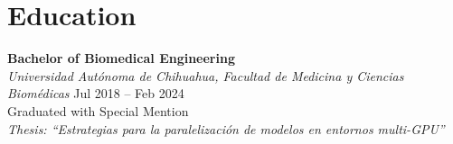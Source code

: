\section*{Education}

\textbf{Bachelor of Biomedical Engineering} \\
\textit{Universidad Autónoma de Chihuahua, Facultad de Medicina y Ciencias Biomédicas} \hfill Jul 2018 -- Feb 2024 \\
Graduated with Special Mention \\ 
\textit{Thesis: “Estrategias para la paralelización de modelos en entornos multi-GPU”}
